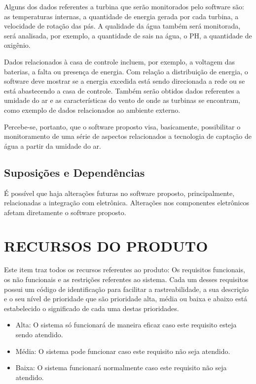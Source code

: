 \documentclass[12pt,openright,oneside,a4paper,brazil]{abntex2}
\begin{document}
	Alguns dos dados referentes a turbina que serão monitorados pelo software são: as temperaturas internas, a quantidade de energia gerada por cada turbina, a velocidade de rotação das pás. A qualidade da água também será monitorada, será analisada, por exemplo, a quantidade de sais na água, o PH, a quantidade de oxigênio.
	
	Dados relacionados à casa de controle incluem, por exemplo, a voltagem das baterias, a falta ou presença de energia. Com relação a distribuição de energia, o software deve mostrar se a energia excedida está sendo direcionada a rede ou se está abastecendo a casa de controle. Também serão obtidos dados referentes a umidade do ar e as características do vento de onde as turbinas se encontram, como exemplo de dados relacionados ao ambiente externo.
	
	Percebe-se, portanto, que o software proposto visa, basicamente, possibilitar o monitoramento de uma série de aspectos relacionados a tecnologia de captação de água a partir da umidade do ar.

\subsection*{Suposições e Dependências}
É possível que haja alterações futuras no software proposto, principalmente, relacionadas a integração com eletrônica. Alterações nos componentes eletrônicos afetam diretamente o software proposto.

\section*{RECURSOS DO PRODUTO}
Este item traz todos os recursos referentes ao produto: Os requisitos funcionais, os não funcionais e as restrições referentes ao sistema. Cada um desses requisitos possui um código de identificação para facilitar a rastreabilidade, a sua descrição e o seu nível de prioridade que são prioridade alta, média ou baixa e abaixo está estabelecido o significado de cada uma destas prioridades.
\begin{itemize}
\item Alta:  O sistema só funcionará de maneira eficaz caso este requisito esteja sendo atendido.
\item Média: O sistema pode 	funcionar caso este requisito não seja atendido.	
\item Baixa: O sistema funcionará 	normalmente caso este requisito não seja atendido.
\end{itemize}
\end{document}
